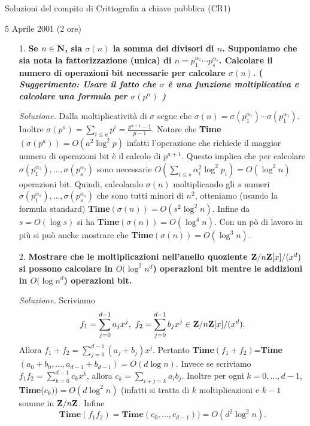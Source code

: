 \documentclass{article}
\begin{document}
\centerline{{\Large Soluzioni del compito di Crittografia a chiave
pubblica (CR1) }}

\centerline{{\large 5 Aprile 2001 (2 ore)}}

\begin{itemize}
\item[1.] \textbf{
Se $n\in{\bf N}$, sia $\sigma(n)$ la somma dei divisori di $n$.
Supponiamo che sia nota la fattorizzazione (unica) di
$n=p_1^{\alpha_1}\cdots p_s^{\alpha_s}$. Calcolare il numero di
operazioni bit necessarie per calcolare $\sigma(n)$. (\it
Suggerimento: Usare il fatto che $\sigma$ \`{e} una funzione
moltiplicativa e calcolare una formula per $\sigma(p^\alpha)$
\rm)}
\medskip

\noindent\emph{Soluzione.} Dalla moltiplicativit\`{a} di $\sigma$
segue che
$\sigma(n)=\sigma(p_1^{\alpha_1})\cdots\sigma(p_1^{\alpha_1})$.
Inoltre $\sigma(p^a)=\sum_{i\leq a}p^i=\frac{p^{a+1}-1}{p-1}$.
Notare che {\bf Time}$(\sigma(p^a))=O(a^2\log^2 p)$ infatti
l'operazione che richiede il maggior numero di operazioni bit
\`{e} il calcolo di $p^{a+1}$. Questo implica che per calcolare
$\sigma(p_1^{\alpha_1}),\ldots, \sigma(p_s^{\alpha_s})$ sono
necessarie $O(\sum_{i\leq s}\alpha_i^2\log^2p_i)= O(\log^2 n)$
operazioni bit. Quindi, calcolando $\sigma(n)$ moltiplicando gli
$s$ numeri $\sigma(p_1^{\alpha_1}),\ldots, \sigma(p_s^{\alpha_s})$
che sono tutti minori di $n^2$, otteniamo (usando la formula
standard) \textbf{Time}$(\sigma(n))=O(s^2\log^2 n)$. Infine da
$s=O(\log s)$ si ha \textbf{Time}$(\sigma(n))=O(\log^4 n)$. Con un
p\`{o} di lavoro in pi\`{u} si pu\`{o} anche mostrare che
\textbf{Time}$(\sigma(n))=O(\log^3 n)$.
\bigskip

\item[2.] \textbf{Mostrare che le moltiplicazioni nell'anello
quoziente ${\bf Z}/n{\bf Z}[x]/(x^d)$ si possono calcolare in
$O(\log^2 n^d$) operazioni bit mentre le addizioni in $O(\log
n^d$) operazioni bit.}\medskip


\noindent\emph{Soluzione.} Scriviamo
$$f_1=\sum_{j=0}^{d-1}a_jx^j,\ f_2=\sum_{j=0}^{d-1}b_jx^j\in
{\bf Z}/n{\bf Z}[x]/(x^d).$$ Allora
$f_1+f_2=\displaystyle\sum_{j=0}^{d-1}(a_j+b_j)x^j.$ Pertanto
\textbf{Time}$(f_1+f_2)$=\textbf{Time}$(a_0+b_0,\ldots,a_{d-1}+b_{d-1})=O(d\log
n)$. Invece se scriviamo $f_1f_2=\sum_{k=0}^{d-1}c_kx^k$, allora
$c_k=\sum_{i+j=k}a_ib_j$. Inoltre per ogni $k=0,\ldots,d-1$,
\textbf{Time}($c_k))=O(d\log^2n)$ (infatti si tratta di $k$
moltiplicazioni e $k-1$ somme in ${\bf Z}/n{\bf Z}$. Infine
$$\textbf{Time}(f_1f_2)=\textbf{Time}(c_0,\ldots,c_{d-1}))=O(d^2\log^2n).$$
\bigskip



\end{itemize}
\end{document}
